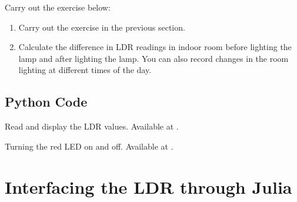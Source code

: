 \begin{enumerate}
        
\end{enumerate}

\begin{exercise}
  Carry out the exercise below:
  \begin{enumerate}
    \item Carry out the exercise in the previous section.
    \item Calculate the difference in LDR readings in indoor room
          before lighting the lamp and after lighting the lamp. You can also
          record changes in the room lighting at different times of the day.
  \end{enumerate}
\end{exercise}

\subsection{Python Code}
\label{sec:ldr-python-code}

\begin{pycode}
  {Read and display the LDR values.  Available at
    .}
  \label{py:ldr-read}
  
\end{pycode}

\begin{pycode}
  {Turning the red LED on and off.  Available at
    .}
  \label{py:ldr-led}
  
\end{pycode}

\section{Interfacing the LDR through Julia}
